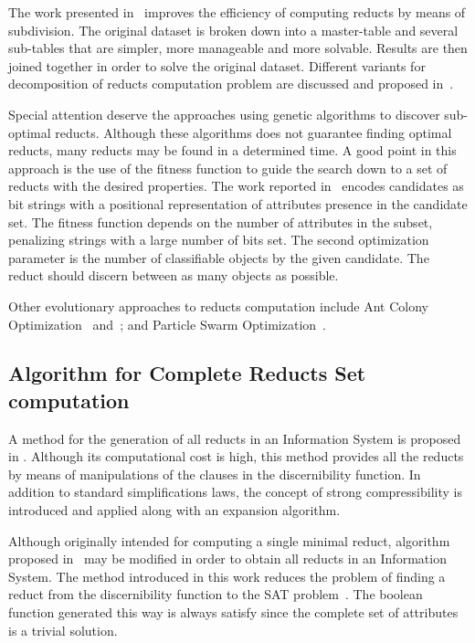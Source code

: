 \documentclass[11pt]{article}   %
\begin{document}
  The work presented in~\cite{Jiao10} improves the efficiency of computing reducts by means of subdivision. The 
  original dataset is broken down into a master-table and several sub-tables that are simpler, more manageable 
  and more solvable. Results are then joined together in order to solve the original dataset. Different variants
  for decomposition of reducts computation problem are discussed and proposed in~\cite{Strakowski08}.
  
  Special attention deserve the approaches using genetic algorithms to discover sub-optimal reducts. Although 
  these algorithms does not guarantee finding optimal reducts, many reducts may be found in a determined time.
  A good point in this approach is the use of the fitness function to guide the search down to a set of 
  reducts with the desired properties. The work reported in~\cite{Wroblewski95} encodes candidates as bit 
  strings with a positional representation of attributes presence in the candidate set. The fitness function
  depends on the number of attributes in the subset, penalizing strings with a large number of bits set. The 
  second optimization parameter is the number of classifiable objects by the given candidate. The reduct should 
  discern between as many objects as possible.
  
  Other evolutionary approaches to reducts computation include Ant Colony Optimization~\cite{Jensen03}
  and~\cite{Chen10}; and Particle Swarm Optimization~\cite{Wang07}.
    
\subsection{Algorithm for Complete Reducts Set computation}
  A method for the generation of all reducts in an Information System is proposed in \cite{Starzyk99,Starzyk00}.
  Although its computational cost is high, this method provides all the reducts by means of manipulations of 
  the clauses in the discernibility function. In addition to standard simplifications laws, the concept of 
  strong compressibility is introduced and applied along with an expansion algorithm.
  
  Although originally intended for computing a single minimal reduct, algorithm proposed in~\cite{Jensen14} may be
  modified in order to obtain all reducts in an Information System. The method introduced in this work reduces
  the problem of finding a reduct from the discernibility function to the SAT problem~\cite{Davis62}. The boolean
  function generated this way is always satisfy since the complete set of attributes is a trivial solution.
 
\end{document}

